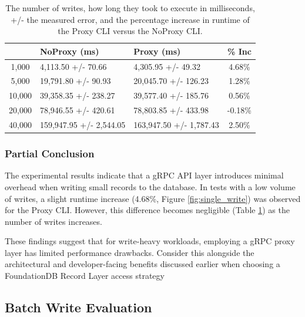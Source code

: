 \documentclass[sigconf]{acmart}
\begin{document}
\begin{table}[h]
\begin{tabular}{|c|l|l|c|}
    \hline
    \rowcolor[HTML]{656565} 
    \multicolumn{1}{|c}{\cellcolor[HTML]{656565}{\color[HTML]{FFFFFF} \textbf{N}}} &
    {\color[HTML]{FFFFFF} \textbf{NoProxy (ms)}} &
    {\color[HTML]{FFFFFF} \textbf{Proxy (ms)}} &
    {\color[HTML]{FFFFFF} \textbf{\% Inc}} \\ \hline
    1,000  & 4,113.50 +/- 70.66      & 4,305.95 +/- 49.32      & 4.68\%  \\
    \rowcolor[HTML]{EFEFEF} 
    5,000  & 19,791.80 +/- 90.93     & 20,045.70 +/- 126.23    & 1.28\%  \\
    10,000 & 39,358.35 +/- 238.27    & 39,577.40 +/- 185.76    & 0.56\%  \\
    \rowcolor[HTML]{EFEFEF} 
    20,000 & 78,946.55 +/- 420.61    & 78,803.85 +/- 433.98    & -0.18\% \\
    40,000 & 159,947.95 +/- 2,544.05 & 163,947.50 +/- 1,787.43 & 2.50\%  \\ \hline
\end{tabular}
\caption{The number of writes, how long they took to execute in milliseconds, +/- the measured error, and the percentage increase in runtime of the Proxy CLI versus the NoProxy CLI.}
\label{tab:single_write}
\end{table}

\subsubsection{Partial Conclusion}

The experimental results indicate that a gRPC API layer introduces minimal overhead when writing small records to the database. In tests with a low volume of writes, a slight runtime increase (4.68\%, Figure \ref{fig:single_write}) was observed for the Proxy CLI. However, this difference becomes negligible (Table \ref{tab:single_write}) as the number of writes increases.

These findings suggest that for write-heavy workloads, employing a gRPC proxy layer has limited performance drawbacks. Consider this alongside the architectural and developer-facing benefits discussed earlier when choosing a FoundationDB Record Layer access strategy

\subsection{Batch Write Evaluation}
\end{document}
